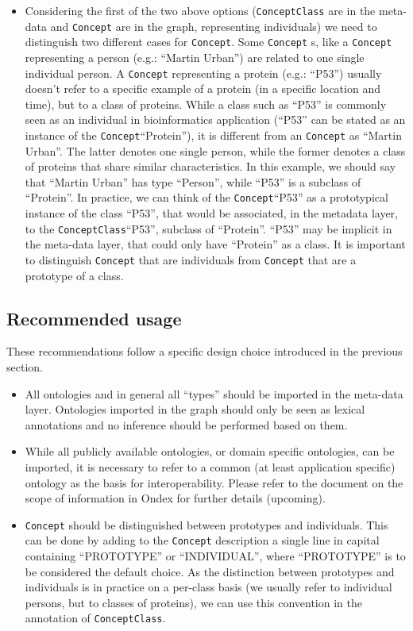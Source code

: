 \documentclass[a4paper,10pt]{article}
\newcommand{\term}[1]{\texttt{#1}\xspace}
\newcommand{\cc}{\term{ConceptClass}}
\newcommand{\co}{\term{Concept}}
\begin{document}
\begin{itemize}
\begin{itemize}
\item Considering the first of the two above options (\cc are in the meta-data and  \co are in the graph, representing individuals) we need to distinguish two different cases for \co.
Some \co s, like a \co representing a person (e.g.: ``Martin Urban'') are related to one single individual person. A \co representing a protein (e.g.: ``P53'') usually doesn't refer to a specific example of a protein (in a specific location and time), but to a class of proteins.
\newline
\newline
While a class such as ``P53'' is commonly seen as an individual in bioinformatics application (``P53'' can be stated as an instance of  the \co ``Protein''), it is different from an \co as ``Martin Urban''. The latter denotes one single person, while the former denotes a class of proteins that share similar characteristics. In this example, we should say that ``Martin Urban'' has type ``Person'', while ``P53'' is a subclass of ``Protein''.
In practice, we can think of the \co``P53'' as a prototypical instance of the class ``P53'', that would be associated, in the metadata layer, to the \cc ``P53'', subclass of ``Protein''. ``P53'' may be implicit in the meta-data layer, that could only have ``Protein'' as a class.
It is important to distinguish \co that are individuals from \co that are a prototype of a class. 
\end{itemize}
\end{itemize}



\subsection{Recommended usage}
These recommendations follow a specific design choice introduced in the previous section.
\begin{itemize}
\item All ontologies and in general all ``types'' should be imported in the meta-data layer. Ontologies imported in the graph should only be seen as lexical annotations and no inference should be performed based on them.
\item While all publicly available ontologies, or domain specific ontologies, can be imported, it is necessary to refer to a common (at least application specific) ontology as the basis for interoperability. Please refer to the document on the scope of information in Ondex for further details (upcoming).
\item \co should be distinguished between prototypes and individuals. This can be done by adding to the \co description a single line in capital containing ``PROTOTYPE'' or ``INDIVIDUAL'', where ``PROTOTYPE'' is to be considered the default choice. As the distinction between prototypes and individuals is in practice on a per-class basis (we usually refer to individual persons, but to classes of proteins), we can use this convention in the annotation of \cc. 

\end{itemize}
\end{document}
